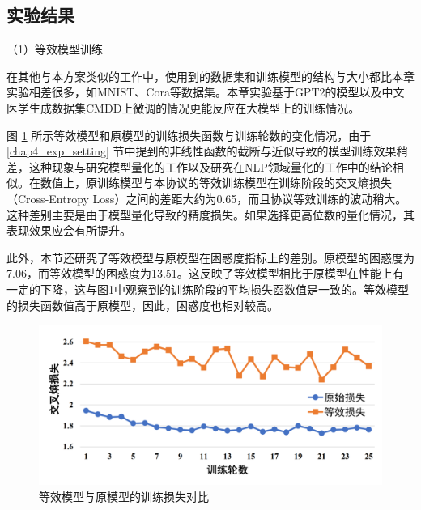 \subsection{实验结果}

（1）等效模型训练

在其他与本方案类似的工作中\cite{secureml, secgnn, SecureNN}，使用到的数据集和训练模型的结构与大小都比本章实验相差很多，如MNIST、Cora等数据集。本章实验基于GPT2的模型以及中文医学生成数据集CMDD上微调的情况更能反应在大模型上的训练情况。

图 \ref{Chap4_clip_param_Loss} 所示等效模型和原模型的训练损失函数与训练轮数的变化情况，由于 \ref{chap4_exp_setting} 节中提到的非线性函数的截断与近似导致的模型训练效果稍差，这种现象与研究模型量化的工作\cite{fixpoint_bp_train, Post_training_piecewise_lin}以及研究在NLP领域量化\cite{gupta2020compression, zafrir2019q8bert}的工作中的结论相似。在数值上，原训练模型与本协议的等效训练模型在训练阶段的交叉熵损失（Cross-Entropy Loss）之间的差距大约为0.65，而且协议等效训练的波动稍大。这种差别主要是由于模型量化导致的精度损失。如果选择更高位数的量化情况，其表现效果应会有所提升。

此外，本节还研究了等效模型与原模型在困惑度指标上的差别。原模型的困惑度为7.06，而等效模型的困惑度为13.51。这反映了等效模型相比于原模型在性能上有一定的下降，这与图\ref{Chap4_clip_param_Loss}中观察到的训练阶段的平均损失函数值是一致的。等效模型的损失函数值高于原模型，因此，困惑度也相对较高。
\begin{figure}[h]
	\centering
	\includegraphics[width=0.8\linewidth]{figures/Chap4_clip_param_Loss.png}
	\caption{等效模型与原模型的训练损失对比}
	\label{Chap4_clip_param_Loss}
\end{figure}



%		

